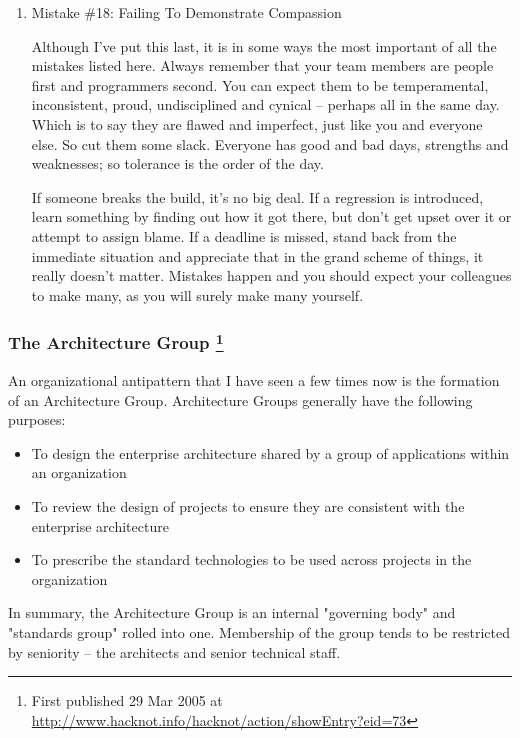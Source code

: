 \documentclass{article}
\begin{document}
\begin{enumerate}
\item Mistake \#18: Failing To Demonstrate Compassion
\label{sec:orgheadline161}

Although I've put this last, it is in some ways the most important of
all the mistakes listed here. Always remember that your team members are
people first and programmers second. You can expect them to be
temperamental, inconsistent, proud, undisciplined and cynical -- perhaps
all in the same day. Which is to say they are flawed and imperfect, just
like you and everyone else. So cut them some slack. Everyone has good
and bad days, strengths and weaknesses; so tolerance is the order of the
day.

If someone breaks the build, it's no big deal. If a regression is
introduced, learn something by finding out how it got there, but don't
get upset over it or attempt to assign blame. If a deadline is missed,
stand back from the immediate situation and appreciate that in the grand
scheme of things, it really doesn't matter. Mistakes happen and you
should expect your colleagues to make many, as you will surely make many
yourself.
\end{enumerate}

\subsubsection{The Architecture Group  \footnote{First published 29 Mar 2005 at
\url{http://www.hacknot.info/hacknot/action/showEntry?eid=73}}}
\label{sec:orgheadline164}

An organizational antipattern that I have seen a few times now is the
formation of an Architecture Group. Architecture Groups generally have
the following purposes:

\begin{itemize}
\item To design the enterprise architecture shared by a group of
applications within an organization
\item To review the design of projects to ensure they are consistent with
the enterprise architecture
\item To prescribe the standard technologies to be used across projects in
the organization
\end{itemize}

In summary, the Architecture Group is an internal "governing body" and
"standards group" rolled into one. Membership of the group tends to be
restricted by seniority -- the architects and senior technical staff.
\end{document}
